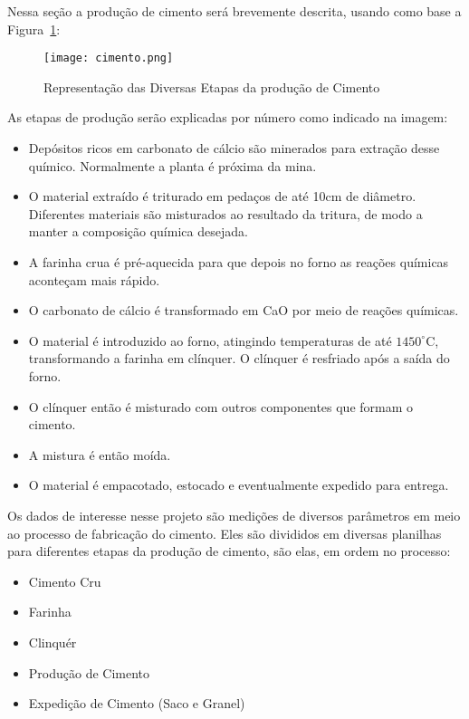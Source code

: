Nessa seção a produção de cimento será brevemente descrita, usando como base a Figura~\ref{fig:cimento}:  

\begin{figure}[H]
\centering
\texttt{[image: cimento.png]}
\caption{Representação das Diversas Etapas da produção de Cimento \citep{cementroadmap}}
\label{fig:cimento}
\end{figure}


As etapas de produção serão explicadas por número como indicado na imagem: \\

\begin{itemize}

\item[1] Depósitos ricos em carbonato de cálcio são minerados para extração desse químico. Normalmente a planta é próxima da mina.
\item[2] O material extraído é triturado em pedaços de até 10cm de diâmetro. Diferentes materiais são misturados ao resultado da tritura, de modo a manter a composição química desejada. 
\item[3] A farinha crua é pré-aquecida para que depois no forno as reações químicas aconteçam mais rápido. 
\item[4] O carbonato de cálcio é transformado em CaO por meio de reações químicas.  
\item[5] O material é introduzido ao forno, atingindo temperaturas de até $1450^\circ$C, transformando a farinha em clínquer. O clínquer é resfriado após a saída do forno. 
\item[6] O clínquer então é misturado com outros componentes que formam o cimento.
\item[7] A mistura é então moída.
\item[8] O material é empacotado, estocado e eventualmente expedido para entrega.

\end{itemize}

Os dados de interesse nesse projeto são medições de diversos parâmetros em meio ao processo de fabricação do cimento. Eles são divididos em diversas planilhas para diferentes etapas da produção de cimento, são elas, em ordem no processo:

\begin{itemize}
        \item Cimento Cru
        \item Farinha
        \item Clinquér
        \item Produção de Cimento
        \item Expedição de Cimento (Saco e Granel)
\end{itemize}

